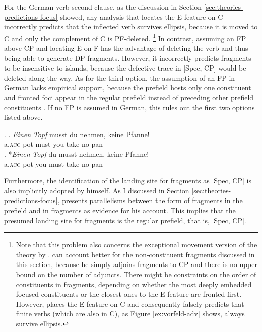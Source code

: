 For the German verb-second clause, as the discussion in Section \ref{sec:theories-predictions-focus} showed, any analysis that locates the E feature on C incorrectly predicts that the inflected verb survives ellipsis, because it is moved to C and only the complement of C is PF-deleted.%
%
\footnote{Note that this problem also concerns the exceptional movement version of the theory by \citet{weir2014}. \citeauthor{weir2014} can account better for the non-constituent fragments discussed in this section, because he simply adjoins fragments to CP and there is no upper bound on the number of adjuncts. There might be constraints on the order of constituents in fragments, depending on whether the most deeply embedded focused constituents or the closest ones to the E feature are fronted first. However, \citeauthor{weir2014} places the E feature on C and consequently falsely predicts that finite verbs (which are also in C), as Figure \ref{ex:vorfeld-adv} shows, always survive ellipsis.}\afterfn%
%
In contrast, assuming an FP above CP and locating E on F has the advantage of deleting the verb and thus being able to generate DP fragments. However, it incorrectly predicts fragments to be insensitive to islands, because the defective trace in [Spec, CP] would be deleted along the way. As for the third option, the assumption of an FP in German lacks empirical support, because the prefield hosts only one constituent and fronted foci appear in the regular prefield \Next[a] instead of preceding other prefield constituents \Next[b]. If no FP is assumed in German, this rules out the first two options listed above.

\ex. \ag. \textit{Einen} \textit{Topf} musst du nehmen, keine Pfanne!\\
	  a.\textsc{acc} pot must you take no pan\\
      \bg. *\textit{Einen} \textit{Topf}  du musst nehmen, keine Pfanne!\\
	  a.\textsc{acc} pot you must take no pan\\
	 
Furthermore, the identification of the landing site for fragments as [Spec, CP] is also implicitly adopted by \citet{merchant2004} himself. As I discussed in Section \ref{sec:theories-predictions-focus}, \citet[702]{merchant2004} presents parallelisms between the form of fragments in the prefield and in fragments as evidence for his account. This  implies that the presumed landing site for fragments is the regular prefield, that is, [Spec, CP].

